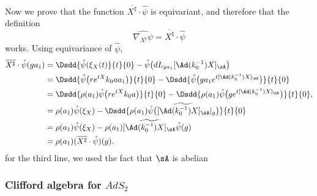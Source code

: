 Now we prove that the function $\overline{ X^{\sharp} }\cdot\hat{\psi}$ is equivariant, and therefore that the definition
\[
	\widehat{\nabla_{X^{\sharp}}\psi}=\overline{ X^{\sharp} }\cdot\hat{\psi}
\]
works. Using equivariance of $\hat{\psi}$,
\begin{equation}
	\begin{aligned}
		\overline{ X^{\sharp} }\cdot \hat{\psi}(ga_1) & =\Dsdd{ \hat{\psi}(\xi_X(t) }{t}{0}-\hat{\psi}\big( dL_{ga_1}[\Ad(k_0^{-1})X]_{\sA} \big)                                                \\
		                                              & =\Dsdd{ \hat{\psi}\big( r e^{tX}k_0aa_1 \big) }{t}{0}-\Dsdd{ \hat{\psi}\big( ga_1 e^{t[\Ad(k_0^{-1})X]_{\sA}} \big) }{t}{0}              \\
		                                              & =\Dsdd{ \rho(a_1)\hat{\psi}\big( r e^{tX}k_0a \big) }{t}{0}-\Dsdd{ \rho(a_1)\hat{\psi}\big( g e^{t[\Ad(k_0^{-1})X]_{\sA}} \big) }{t}{0}, \\
		                                              & =\rho(a_1)\hat{\psi}(\xi_X)-\Dsdd{ \rho(a_1)\hat{\psi}\big( \widetilde{[\Ad(k_0^{-1})X]_{\sA} }|_g \big) }{t}{0}                         \\
		                                              & =\rho(a_1)\hat{\psi}(\xi_X)-\rho(a_1)\widetilde{ [\Ad(k_0^{-1})X]_{\sA}  }\hat{\psi}(g)                                                  \\
		                                              & =\rho(a_1)(\overline{ X^{\sharp} }\cdot\hat{\psi})(g).
	\end{aligned}
\end{equation}
for the third line, we used the fact that $\sA$ is abelian
\subsubsection{Clifford algebra for \texorpdfstring{$AdS_2$}{AdS2}}

